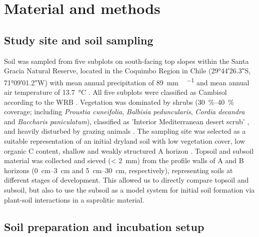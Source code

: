 \section{Material and methods}
\subsection{Study site and soil sampling}

Soil was sampled from five subplots on south-facing top slopes within the Santa Gracia Natural Reserve, located in the Coquimbo Region in Chile (\ang{29;44;26.3}S, \ang{71;09;01.2}W) with mean annual precipitation of \SI{89}{\milli\metre\,\year^{-1}} and mean annual air temperature of \SI{13.7}{\degreeCelsius} \citep{MinisterioObrasPublicas2017}. All five subplots were classified as Cambisol according to the WRB \citep{IUSSWorkingGroupWRB2015}. Vegetation was dominated by shrubs (\SIrange{30}{40}{\percent} coverage; including \textit{Proustia cuneifolia}, \textit{Balbisia peduncularis}, \textit{Cordia decandra} and \textit{Baccharis paniculatum}), classified as 'Interior Mediterranean desert scrub' \citep{Luebert2006}, and heavily disturbed by grazing animals \citep{Oeser2018}. The sampling site was selected as a suitable representation of an initial dryland soil with low vegetation cover, low organic C content, shallow and weakly structured A horizon \citep{Bernhard2018}. Topsoil and subsoil material was collected and sieved (\SI{< 2}{\milli\metre}) from the profile walls of A and B horizons (\SIrange{0}{3}{\centi\metre} and \SIrange{5}{30}{\centi\metre}, respectively), representing soils at different stages of development. This allowed us to directly compare topsoil and subsoil, but also to use the subsoil as a model system for initial soil formation via plant-soil interactions in a saprolitic material.

\subsection{Soil preparation and incubation setup}

